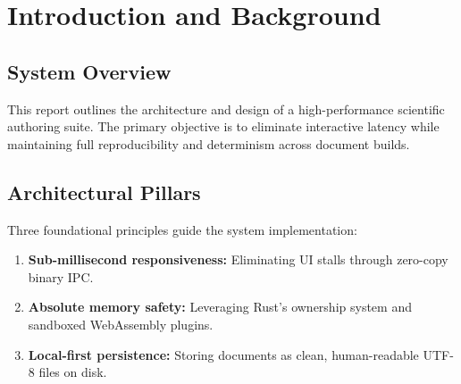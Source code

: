 \chapter{Introduction and Background}

\section{System Overview}
This report outlines the architecture and design of a high-performance scientific authoring suite. The primary objective is to eliminate interactive latency while maintaining full reproducibility and determinism across document builds.

\section{Architectural Pillars}
Three foundational principles guide the system implementation:
\begin{enumerate}
  \item \textbf{Sub-millisecond responsiveness:} Eliminating UI stalls through zero-copy binary IPC.
  \item \textbf{Absolute memory safety:} Leveraging Rust's ownership system and sandboxed WebAssembly plugins.
  \item \textbf{Local-first persistence:} Storing documents as clean, human-readable UTF-8 files on disk.
\end{enumerate}
